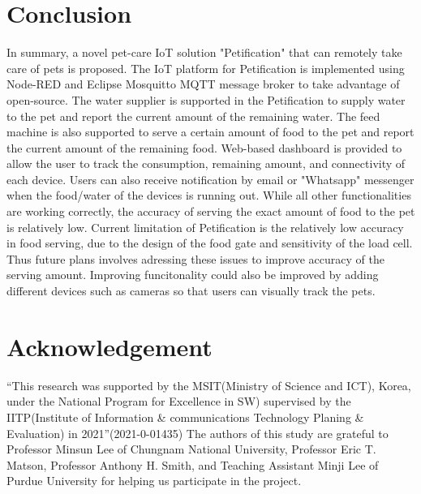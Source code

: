 ﻿\documentclass[conference]{IEEEtran}
\begin{document}
\section{Conclusion}
In summary, a novel pet-care IoT solution "Petification" that can remotely take care of pets is proposed.
The IoT platform for Petification is implemented using Node-RED and Eclipse Mosquitto MQTT message broker to take advantage of open-source.
The water supplier is supported in the Petification to supply water to the pet and report the current amount of the remaining water.
The feed machine is also supported to serve a certain amount of food to the pet and report the current amount of the remaining food.
Web-based dashboard is provided to allow the user to track the consumption, remaining amount, and connectivity of each device.
Users can also receive notification by email or "Whatsapp" messenger when the food/water of the devices is running out.
While all other functionalities are working correctly, the accuracy of serving the exact amount of food to the pet is relatively low.
Current limitation of Petification is the relatively low accuracy in food serving, due to the design of the food gate and sensitivity of the load cell.
Thus future plans involves adressing these issues to improve accuracy of the serving amount.
Improving funcitonality could also be improved by adding different devices such as cameras so that users can visually track the pets.

\section{Acknowledgement}
“This research was supported by the MSIT(Ministry of Science and ICT), Korea, under the National Program for Excellence in SW) supervised by the IITP(Institute of Information \& communications Technology Planing \& Evaluation) in 2021”(2021-0-01435)
The authors of this study are grateful to Professor Minsun Lee of Chungnam National University, Professor Eric T. Matson, Professor Anthony H. Smith, and Teaching Assistant Minji Lee of Purdue University for helping us participate in the project.
\end{document}
